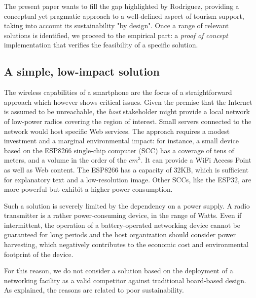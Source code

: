 \documentclass[sustainability,article,submit,pdftex,moreauthors]{Definitions/mdpi}
\begin{document}
The present paper wants to fill the gap highlighted by Rodriguez, providing a conceptual yet pragmatic approach to a well-defined aspect of tourism support, taking into account its sustainability "by design". Once a range of relevant solutions is identified, we proceed to the empirical part: a {\em proof of concept} implementation that verifies the feasibility of a specific solution.


\subsection{A simple, low-impact solution}


The wireless capabilities of a smartphone are the focus of a straightforward approach which however shows critical issues. Given the premise that the Internet is assumed to be unreachable, the {\em host} stakeholder might provide a local network of low-power radios covering the region of interest. Small servers connected to the network would host specific Web services. The approach requires a modest investment and a marginal environmental impact: for instance, a small device based on the ESP8266 single-chip computer (SCC) has a coverage of tens of meters, and a volume in the order of the $cm^3$. It can provide a WiFi Access Point as well as Web content. The ESP8266 has a capacity of 32KB, which is sufficient for explanatory text and a low-resolution image. Other SCCs, like the ESP32, are more powerful but exhibit a higher power consumption. 

Such a solution is severely limited by the dependency on a power supply. A radio transmitter is a rather power-consuming device, in the range of Watts. Even if intermittent, the operation of a battery-operated networking device cannot be guaranteed for long periods and the host organization should consider power harvesting, which negatively contributes to the economic cost and environmental footprint of the device.

For this reason, we do not consider a solution based on the deployment of a networking facility as a valid competitor against traditional board-based design. As explained, the reasons are related to poor sustainability.
\end{document}
